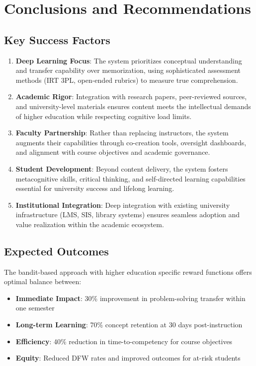 \documentclass[11pt,a4paper]{report}
\begin{document}
\chapter{Conclusions and Recommendations}

\section{Key Success Factors}

\begin{enumerate}
    \item \textbf{Deep Learning Focus}: The system prioritizes conceptual understanding and transfer capability over memorization, using sophisticated assessment methods (IRT 3PL, open-ended rubrics) to measure true comprehension.
    
    \item \textbf{Academic Rigor}: Integration with research papers, peer-reviewed sources, and university-level materials ensures content meets the intellectual demands of higher education while respecting cognitive load limits.
    
    \item \textbf{Faculty Partnership}: Rather than replacing instructors, the system augments their capabilities through co-creation tools, oversight dashboards, and alignment with course objectives and academic governance.
    
    \item \textbf{Student Development}: Beyond content delivery, the system fosters metacognitive skills, critical thinking, and self-directed learning capabilities essential for university success and lifelong learning.
    
    \item \textbf{Institutional Integration}: Deep integration with existing university infrastructure (LMS, SIS, library systems) ensures seamless adoption and value realization within the academic ecosystem.
\end{enumerate}

\section{Expected Outcomes}

The bandit-based approach with higher education specific reward functions offers optimal balance between:

\begin{itemize}
    \item \textbf{Immediate Impact}: 30\% improvement in problem-solving transfer within one semester
    \item \textbf{Long-term Learning}: 70\% concept retention at 30 days post-instruction
    \item \textbf{Efficiency}: 40\% reduction in time-to-competency for course objectives
    \item \textbf{Equity}: Reduced DFW rates and improved outcomes for at-risk students
\end{itemize}
\end{document}
